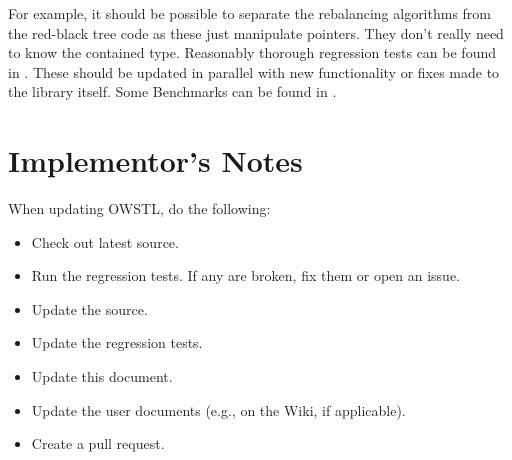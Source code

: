 For example, it should be possible to separate the rebalancing algorithms from
the red-black tree code as these just manipulate pointers. They don't really
need to know the contained type. Reasonably thorough regression tests can be
found in . These should be updated in parallel with
new functionality or fixes made to the library itself. Some Benchmarks can be
found in .

\section{Implementor's Notes}

When updating OWSTL, do the following:
\begin{itemize}
\item Check out latest source.
\item Run the regression tests. If any are broken, fix them or open an issue.
\item Update the source.
\item Update the regression tests.
\item Update this document.
\item Update the user documents (e.g., on the Wiki, if applicable).
\item Create a pull request.
\end{itemize}
